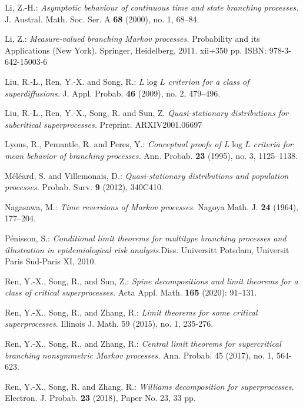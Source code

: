 \documentclass[12pt,a4paper]{amsart}
\numberwithin{equation}{section}
\theoremstyle{plain}
\theoremstyle{definition}
\theoremstyle{remark}
\begin{document}
\begin{thebibliography}{99}
Li, Z.-H.:
\emph{Asymptotic behaviour of continuous time and state branching processes.}
J. Austral. Math. Soc. Ser. A \textbf{68} (2000), no. 1, 68--84.

Li, Z.:
\emph{Measure-valued branching Markov processes.}
Probability and its Applications (New York). Springer, Heidelberg, 2011. xii+350 pp. ISBN: 978-3-642-15003-6

Liu, R.-L., Ren, Y.-X. and Song, R.:
\emph{{$L \log L$} criterion for a class of superdiffusions.}
J. Appl. Probab. \textbf{46} (2009), no. 2, 479--496.

Liu, R.-L., Ren, Y.-X., Song, R. and Sun, Z.
\emph{Quasi-stationary distributions for subcritical superprocesses.}
Preprint.
ARXIV{2001.06697}

Lyons, R., Pemantle, R. and Peres, Y.:
\emph{Conceptual proofs of $L\log L$ criteria for mean behavior of branching processes.}
Ann. Probab. \textbf{23} (1995), no. 3, 1125--1138.

M\'el\'eard, S. and Villemonais, D.:
\emph{Quasi-stationary distributions and population processes.}
Probab. Surv. \textbf{9} (2012), 340C410.

Nagasawa, M.:
\emph{Time reversions of Markov processes.}
Nagoya Math. J. \textbf{24} (1964), 177--204.

P\'enisson, S.:
\emph{Conditional limit theorems for multitype branching processes and illustration in epidemiological risk analysis.}Diss. Universitt Potsdam, Universit Paris Sud-Paris XI, 2010.

	Ren, Y.-X., Song, R., and Sun, Z.:
	\emph{Spine decompositions and limit theorems for a class of critical superprocesses.}
	Acta Appl. Math. \textbf{165} (2020): 91--131.

Ren, Y.-X., Song, R., and Zhang, R.:
\emph{Limit theorems for some critical superprocesses.}
Illinois J. Math. 59 (2015), no. 1, 235-276.

Ren, Y.-X., Song, R., and Zhang, R.:
\emph{Central limit theorems for supercritical branching nonsymmetric Markov processes.}
Ann. Probab. 45 (2017), no. 1, 564-623.

Ren, Y.-X., Song, R. and Zhang, R.:
\emph{Williams decomposition for superprocesses.}
Electron. J. Probab. \textbf{23} (2018), Paper No. 23, 33 pp.


\end{thebibliography}
\end{document}

